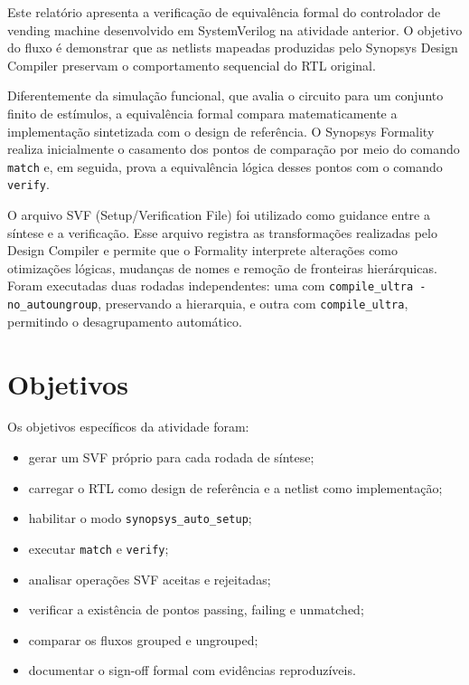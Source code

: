 \documentclass[11pt,a4paper]{article}
\begin{document}
Este relatório apresenta a verificação de equivalência formal do controlador de vending machine desenvolvido em SystemVerilog na atividade anterior. O objetivo do fluxo é demonstrar que as netlists mapeadas produzidas pelo Synopsys Design Compiler preservam o comportamento sequencial do RTL original.

Diferentemente da simulação funcional, que avalia o circuito para um conjunto finito de estímulos, a equivalência formal compara matematicamente a implementação sintetizada com o design de referência. O Synopsys Formality realiza inicialmente o casamento dos pontos de comparação por meio do comando \texttt{match} e, em seguida, prova a equivalência lógica desses pontos com o comando \texttt{verify}.

O arquivo SVF (Setup/Verification File) foi utilizado como guidance entre a síntese e a verificação. Esse arquivo registra as transformações realizadas pelo Design Compiler e permite que o Formality interprete alterações como otimizações lógicas, mudanças de nomes e remoção de fronteiras hierárquicas. Foram executadas duas rodadas independentes: uma com \texttt{compile\_ultra -no\_autoungroup}, preservando a hierarquia, e outra com \texttt{compile\_ultra}, permitindo o desagrupamento automático.

\section{Objetivos}

Os objetivos específicos da atividade foram:

\begin{itemize}[leftmargin=1.2cm,itemsep=2pt]
    \item gerar um SVF próprio para cada rodada de síntese;
    \item carregar o RTL como design de referência e a netlist como implementação;
    \item habilitar o modo \texttt{synopsys\_auto\_setup};
    \item executar \texttt{match} e \texttt{verify};
    \item analisar operações SVF aceitas e rejeitadas;
    \item verificar a existência de pontos passing, failing e unmatched;
    \item comparar os fluxos grouped e ungrouped;
    \item documentar o sign-off formal com evidências reproduzíveis.
\end{itemize}
\end{document}
